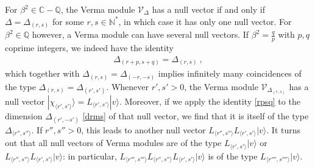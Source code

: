 \documentclass[12pt, a4paper]{article}
\theoremstyle{break}
\begin{document}
For $\beta^2\in\mathbb{C}-\mathbb{Q}$, the Verma module $\mathcal{V}_\Delta$ has a null vector if and only if $\Delta=\Delta_{(r, s)}$ for some $r,s\in\mathbb{N}^*$, in which case it has only one null vector. For $\beta^2\in\mathbb{Q}$ however, a Verma module can have several null vectors. If $\beta^2 = \frac{q}{p}$ with $p,q$ coprime integers, we indeed have the identity
\begin{align}
 \Delta_{(r+p,s+q)} = \Delta_{(r,s)}\ ,
 \label{rpsq}
\end{align}
which together with $\Delta_{(r,s)}=\Delta_{(-r,-s)}$ implies infinitely many coincidences of the type $\Delta_{(r,s)}=\Delta_{(r',s')}$. 
Whenever $r',s'>0$, the Verma module $\mathcal{V}_{\Delta_{(r,s)}}$ has a null vector $|\chi_{\langle r',s'\rangle}\rangle= L_{\langle r',s'\rangle} |v\rangle$. 
Moreover, if we apply the identity \eqref{rpsq} to the dimension $\Delta_{(r',-s')}$ \eqref{drms} of that null vector, we find that it is itself of the type $\Delta_{\langle r'',s''\rangle}$. If $r'',s''>0$, this leads to another null vector $L_{\langle r'',s''\rangle}L_{\langle r',s'\rangle} |v\rangle$. It turns out that all null vectors of Verma modules are of the type $L_{\langle r',s'\rangle} |v\rangle$ or $L_{\langle r'',s''\rangle}L_{\langle r',s'\rangle} |v\rangle$: in particular, $L_{\langle r''',s'''\rangle}L_{\langle r'',s''\rangle}L_{\langle r',s'\rangle} |v\rangle$ is of the type $L_{\langle r'''',s''''\rangle} |v\rangle$.
\end{document}
